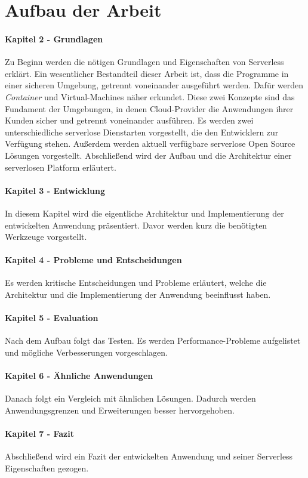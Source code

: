 \section{Aufbau der Arbeit}
\paragraph{Kapitel 2 - Grundlagen} Zu Beginn werden die nötigen Grundlagen und Eigenschaften von Serverless erklärt.
Ein wesentlicher Bestandteil dieser Arbeit ist, dass die Programme in einer sicheren Umgebung,
getrennt voneinander ausgeführt werden. Dafür werden
\textit{Container} und Virtual-Machines 
näher erkundet. Diese zwei Konzepte sind das Fundament der Umgebungen, in denen Cloud-Provider die 
Anwendungen ihrer Kunden sicher und getrennt voneinander ausführen.
Es werden zwei unterschiedliche serverlose Dienstarten vorgestellt, die den Entwicklern zur Verfügung stehen.
Außerdem werden aktuell verfügbare serverlose Open Source Lösungen vorgestellt.
Abschließend wird der Aufbau und die Architektur einer serverlosen Platform erläutert.

\paragraph{Kapitel 3 - Entwicklung} In diesem Kapitel wird die eigentliche Architektur
und Implementierung der entwickelten Anwendung präsentiert. Davor werden kurz die benötigten Werkzeuge
vorgestellt.

\paragraph{Kapitel 4 - Probleme und Entscheidungen} Es werden kritische Entscheidungen und
Probleme erläutert, welche die Architektur und die Implementierung der Anwendung beeinflusst haben.

\paragraph{Kapitel 5 - Evaluation} Nach dem Aufbau folgt das Testen.
Es werden Performance-Probleme aufgelistet und mögliche Verbesserungen vorgeschlagen.

\paragraph{Kapitel 6 - Ähnliche Anwendungen} Danach folgt ein Vergleich mit ähnlichen Lösungen.
Dadurch werden Anwendungsgrenzen und Erweiterungen besser hervorgehoben.

\paragraph{Kapitel 7 - Fazit} Abschließend wird ein Fazit der entwickelten Anwendung und
seiner Serverless Eigenschaften gezogen.
